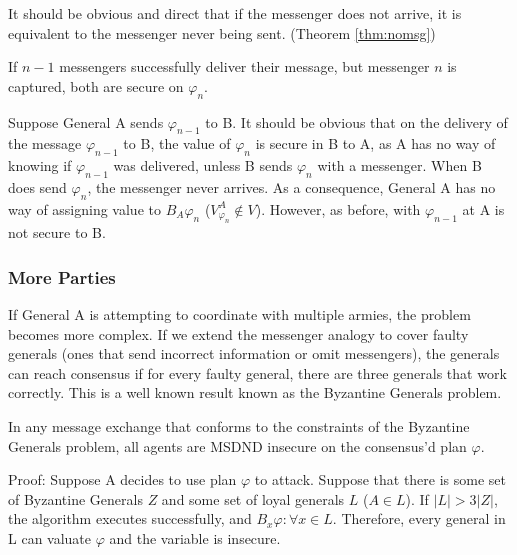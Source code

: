 It should be obvious and direct that if the messenger does not arrive, it is equivalent to the messenger never being sent. (Theorem \ref{thm:nomsg})

\begin{case}
If $n-1$ messengers successfully deliver their message, but messenger $n$ is captured, both are secure on $\varphi_{n}$.
\end{case}

Suppose General A sends $\varphi_{n-1}$ to B. It should be obvious that on the delivery of the message $\varphi_{n-1}$ to B, the value of $\varphi_{n}$ is secure in B to A, as A has no way of knowing if $\varphi_{n-1}$ was delivered, unless B sends $\varphi_{n}$ with a messenger. When B does send $\varphi_{n}$, the messenger never arrives. As a consequence, General A has no way of assigning value to $B_A \varphi_n$ ($V_{\varphi_n}^A \not \in V$). However, as before, with $\varphi_{n-1}$ at A is not secure to B.



\subsubsection{More Parties}

If General A is attempting to coordinate with multiple armies, the problem becomes more complex. If we extend the messenger analogy to cover faulty generals (ones that send incorrect information or omit messengers), the generals can reach consensus if for every faulty general, there are three generals that work correctly. This is a well known result known as the Byzantine Generals problem.

\begin{thm}
In any message exchange that conforms to the constraints of the Byzantine Generals problem, all agents are MSDND insecure on the consensus'd plan $\varphi$.
\end{thm}

Proof: Suppose A decides to use plan $\varphi$ to attack. Suppose that there is some set of Byzantine Generals $Z$ and some set of loyal generals $L$ ($A \in L$). If $|L| > 3|Z|$, the algorithm executes successfully, and $B_x \varphi : \forall x \in L $. Therefore, every general in L can valuate $\varphi$ and the variable is insecure.

